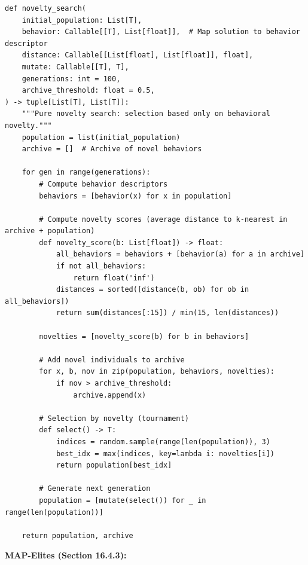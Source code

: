 \begin{verbatim}
def novelty_search(
    initial_population: List[T],
    behavior: Callable[[T], List[float]],  # Map solution to behavior descriptor
    distance: Callable[[List[float], List[float]], float],
    mutate: Callable[[T], T],
    generations: int = 100,
    archive_threshold: float = 0.5,
) -> tuple[List[T], List[T]]:
    """Pure novelty search: selection based only on behavioral novelty."""
    population = list(initial_population)
    archive = []  # Archive of novel behaviors

    for gen in range(generations):
        # Compute behavior descriptors
        behaviors = [behavior(x) for x in population]

        # Compute novelty scores (average distance to k-nearest in archive + population)
        def novelty_score(b: List[float]) -> float:
            all_behaviors = behaviors + [behavior(a) for a in archive]
            if not all_behaviors:
                return float('inf')
            distances = sorted([distance(b, ob) for ob in all_behaviors])
            return sum(distances[:15]) / min(15, len(distances))

        novelties = [novelty_score(b) for b in behaviors]

        # Add novel individuals to archive
        for x, b, nov in zip(population, behaviors, novelties):
            if nov > archive_threshold:
                archive.append(x)

        # Selection by novelty (tournament)
        def select() -> T:
            indices = random.sample(range(len(population)), 3)
            best_idx = max(indices, key=lambda i: novelties[i])
            return population[best_idx]

        # Generate next generation
        population = [mutate(select()) for _ in range(len(population))]

    return population, archive
\end{verbatim}

\textbf{MAP-Elites (Section 16.4.3):}

